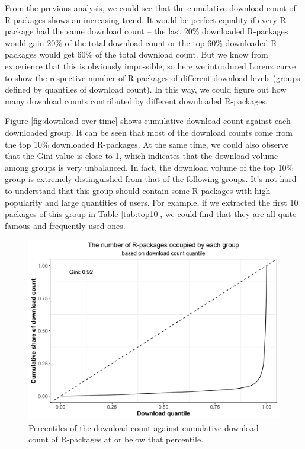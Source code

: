 \documentclass[
]{book}
\begin{document}
From the previous analysis, we could see that the cumulative download count of R-packages shows an increasing trend. It would be perfect equality if every R-package had the same download count -- the last 20\% downloaded R-packages would gain 20\% of the total download count or the top 60\% downloaded R-packages would get 60\% of the total download count. But we know from experience that this is obviously impossible, so here we introduced Lorenz curve\autocite{lorenz} to show the respective number of R-packages of different download levels (groups defined by quantiles of download count). In this way, we could figure out how many download counts contributed by different downloaded R-packages.

Figure \ref{fig:download-over-time} shows cumulative download count against each downloaded group. It can be seen that most of the download counts come from the top 10\% downloaded R-packages. At the same time, we could also observe that the Gini value is close to 1, which indicates that the download volume among groups is very unbalanced. In fact, the download volume of the top 10\% group is extremely distinguished from that of the following groups. It's not hard to understand that this group should contain some R-packages with high popularity and large quantities of users. For example, if we extracted the first 10 packages of this group in Table \ref{tab:top10}, we could find that they are all quite famous and frequently-used ones.



\begin{figure}

{\centering \includegraphics{figures/lorenz-all-1} 

}

\caption{Percentiles of the download count against cumulative download count of R-packages at or below that percentile.}\label{fig:lorenz-all}
\end{figure}
\end{document}
